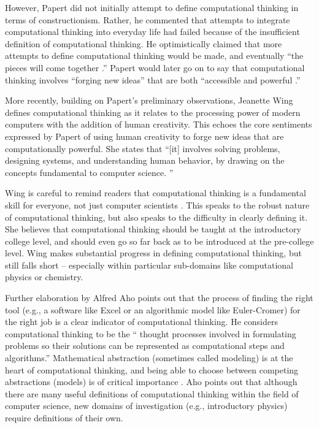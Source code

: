 \documentclass{msuphddissertation}
\begin{document}
\begin{doublespace}
However, Papert did not initially attempt to define computational thinking in terms of constructionism.  Rather, he commented that attempts to integrate computational thinking into everyday life had failed because of the insufficient definition of computational thinking.  He optimistically claimed that more attempts to define computational thinking would be made, and eventually ``the pieces will come together \cite{Papert1981}.''  Papert would later go on to say that computational thinking involves ``forging new ideas'' that are both ``accessible and powerful \cite{Papert1996}.''

More recently, building on Papert's preliminary observations, Jeanette Wing defines computational thinking as it relates to the processing power of modern computers with the addition of human creativity.  This echoes the core sentiments expressed by Papert of using human creativity to forge new ideas that are computationally powerful.  She states that ``[it] involves solving problems, designing systems, and understanding human behavior, by drawing on the concepts fundamental to computer science. \cite{Wing2006}''

Wing is careful to remind readers that computational thinking is a fundamental skill for everyone, not just computer scientists \cite{Wing2008}.  This speaks to the robust nature of computational thinking, but also speaks to the difficulty in clearly defining it.  She believes that computational thinking should be taught at the introductory college level, and should even go so far back as to be introduced at the pre-college level.  Wing makes substantial progress in defining computational thinking, but still falls short -- especially within particular sub-domains like computational physics or chemistry.

Further elaboration by Alfred Aho points out that the process of finding the right tool (e.g., a software like Excel or an algorithmic model like Euler-Cromer) for the right job is a clear indicator of computational thinking.  He considers computational thinking to be the `` thought processes involved in formulating problems so their solutions can be represented as computational steps and algorithms.''  Mathematical abstraction (sometimes called modeling) is at the heart of computational thinking, and being able to choose between competing abstractions (models) is of critical importance \cite{Aho2012}.  Aho points out that although there are many useful definitions of computational thinking within the field of computer science, new domains of investigation (e.g., introductory physics) require definitions of their own.


\end{doublespace}
\end{document}

